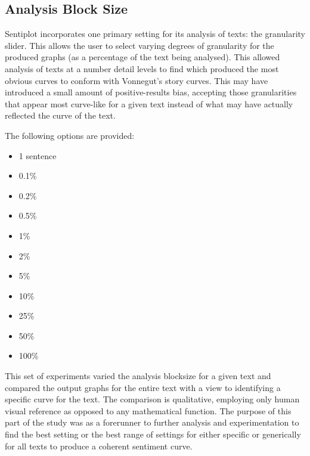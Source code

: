 \documentclass{article}
\begin{document}
    \subsection{Analysis Block Size}
        Sentiplot incorporates one primary setting for its analysis of texts: the granularity slider. This allows the user to select varying degrees of granularity for the produced graphs (as a percentage of the text being analysed). This allowed analysis of texts at a number detail levels to find which produced the most obvious curves to conform with Vonnegut's story curves. This may have introduced a small amount of positive-results bias, accepting those granularities that appear most curve-like for a given text instead of what may have actually reflected the curve of the text.

        The following options are provided:
        \begin{itemize}
            \item 1 sentence
            \item 0.1\%
            \item 0.2\%
            \item 0.5\%
            \item 1\%
            \item 2\%
            \item 5\%
            \item 10\%
            \item 25\%
            \item 50\%
            \item 100\%
        \end{itemize}
        This set of experiments varied the analysis blocksize for a given text and compared the output graphs for the entire text with a view to identifying a specific curve for the text. The comparison is qualitative, employing only human visual reference as opposed to any mathematical function. The purpose of this part of the study was as a forerunner to further analysis and experimentation to find the best setting or the best range of settings for either specific or generically for all texts to produce a coherent sentiment curve.
\end{document}
